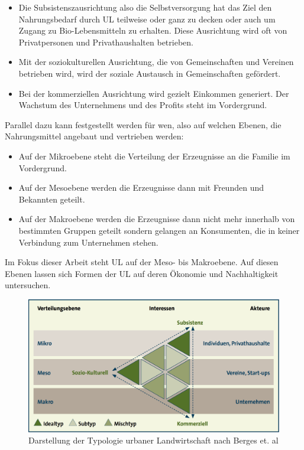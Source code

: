 \documentclass{scrartcl}
\begin{document}
\begin{itemize}
\item Die Subsistenszausrichtung also die Selbstversorgung hat das Ziel den Nahrungsbedarf durch UL teilweise oder ganz zu decken oder auch um Zugang zu Bio-Lebensmitteln zu erhalten. Diese Ausrichtung wird oft von Privatpersonen und Privathaushalten betrieben. 
\item Mit der soziokulturellen Ausrichtung, die von Gemeinschaften und Vereinen betrieben wird, wird der soziale Austausch in Gemeinschaften gefördert. 
\item Bei der kommerziellen Ausrichtung wird gezielt Einkommen generiert. Der Wachstum des Unternehmens und des Profits steht im Vordergrund. 
\end{itemize}

Parallel dazu kann festgestellt werden für wen, also auf welchen Ebenen, die Nahrungsmittel angebaut und vertrieben werden:

\begin{itemize}
\item Auf der Mikroebene steht die Verteilung der Erzeugnisse an die Familie im Vordergrund.
\item Auf der Mesoebene werden die Erzeugnisse dann mit Freunden und Bekannten geteilt.
\item Auf der Makroebene werden die Erzeugnisse dann nicht mehr innerhalb von bestimmten Gruppen geteilt sondern gelangen an Konsumenten, die in keiner 
Verbindung zum Unternehmen stehen. 
\end{itemize}

Im Fokus dieser Arbeit steht UL auf der Meso- bis Makroebene. Auf diesen Ebenen lassen sich Formen der UL auf deren Ökonomie und Nachhaltigkeit untersuchen.

\begin{figure}[htbp]
\centering
\includegraphics[width=12cm]{image_folder/ul_typologie.png}
\caption{Darstellung der Typologie urbaner Landwirtschaft nach Berges et. al}
\label{fig:ul_typologie}
\end{figure}
\end{document}
